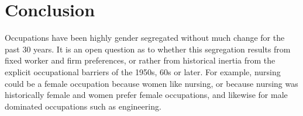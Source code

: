 \documentclass[12pt]{article}
\begin{document}
\section{Conclusion}









Occupations have been highly gender segregated without much change for the past 30 years. It is an open question as to whether this segregation results from fixed worker and firm preferences, or rather from historical inertia from the explicit occupational barriers of the 1950s, 60s or later. For example, nursing could be a female occupation because women like nursing, or because nursing was historically female and women prefer female occupations, and likewise for male dominated occupations such as engineering.

\end{document}
